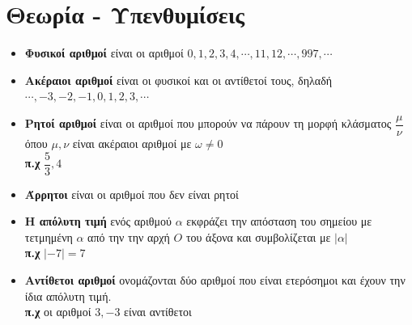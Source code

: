 \documentclass[a4paper,10pt]{report}
\begin{document}
\section*{Θεωρία - Υπενθυμίσεις \hfill \small{}}
\begin{itemize}
 \item \textbf{Φυσικοί αριθμοί} είναι οι αριθμοί $0,1,2,3,4,\cdots ,11,12,\cdots , 997, \cdots$
 \item \textbf{Ακέραιοι αριθμοί} είναι οι φυσικοί και οι αντίθετοί τους, δηλαδή $\cdots ,-3,-2,-1,0,1,2,3,\cdots$ 
 \item \textbf{Ρητοί αριθμοί} είναι οι αριθμοί που μπορούν να πάρουν τη μορφή κλάσματος $\dfrac{μ}{ν}$ 
        όπου $μ,ν$ είναι ακέραιοι αριθμοί με $ω\neq0$\\
        \textbf{π.χ} $\dfrac{5}{3},4$
 \item \textbf{Άρρητοι} είναι οι αριθμοί που δεν είναι ρητοί
 \item \textbf{Η απόλυτη τιμή} ενός αριθμού $α$ εκφράζει την απόσταση του σημείου με τετμημένη $α$ από την 
              την αρχή $Ο$ του άξονα και συμβολίζεται με $|α|$\\
       \textbf{π.χ} $|-7|=7$
\item \textbf{Αντίθετοι αριθμοί} ονομάζονται δύο αριθμοί που είναι ετερόσημοι και έχουν την ίδια απόλυτη τιμή.\\
       \textbf{π.χ} οι αριθμοί $ 3,-3 $ είναι αντίθετοι
\end{itemize}
\end{document}
